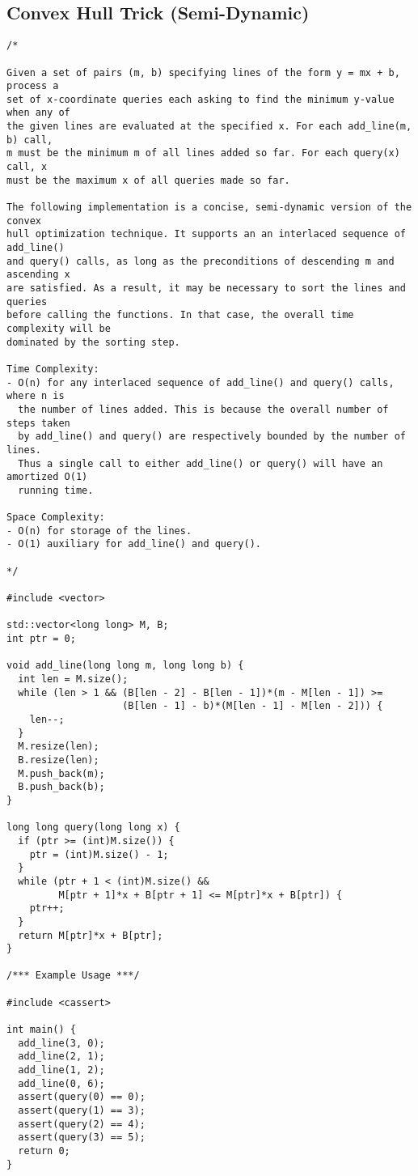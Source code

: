 \subsection{Convex Hull Trick (Semi-Dynamic)}
\begin{lstlisting}
/*

Given a set of pairs (m, b) specifying lines of the form y = mx + b, process a
set of x-coordinate queries each asking to find the minimum y-value when any of
the given lines are evaluated at the specified x. For each add_line(m, b) call,
m must be the minimum m of all lines added so far. For each query(x) call, x
must be the maximum x of all queries made so far.

The following implementation is a concise, semi-dynamic version of the convex
hull optimization technique. It supports an an interlaced sequence of add_line()
and query() calls, as long as the preconditions of descending m and ascending x
are satisfied. As a result, it may be necessary to sort the lines and queries
before calling the functions. In that case, the overall time complexity will be
dominated by the sorting step.

Time Complexity:
- O(n) for any interlaced sequence of add_line() and query() calls, where n is
  the number of lines added. This is because the overall number of steps taken
  by add_line() and query() are respectively bounded by the number of lines.
  Thus a single call to either add_line() or query() will have an amortized O(1)
  running time.

Space Complexity:
- O(n) for storage of the lines.
- O(1) auxiliary for add_line() and query().

*/

#include <vector>

std::vector<long long> M, B;
int ptr = 0;

void add_line(long long m, long long b) {
  int len = M.size();
  while (len > 1 && (B[len - 2] - B[len - 1])*(m - M[len - 1]) >=
                    (B[len - 1] - b)*(M[len - 1] - M[len - 2])) {
    len--;
  }
  M.resize(len);
  B.resize(len);
  M.push_back(m);
  B.push_back(b);
}

long long query(long long x) {
  if (ptr >= (int)M.size()) {
    ptr = (int)M.size() - 1;
  }
  while (ptr + 1 < (int)M.size() &&
         M[ptr + 1]*x + B[ptr + 1] <= M[ptr]*x + B[ptr]) {
    ptr++;
  }
  return M[ptr]*x + B[ptr];
}

/*** Example Usage ***/

#include <cassert>

int main() {
  add_line(3, 0);
  add_line(2, 1);
  add_line(1, 2);
  add_line(0, 6);
  assert(query(0) == 0);
  assert(query(1) == 3);
  assert(query(2) == 4);
  assert(query(3) == 5);
  return 0;
}
\end{lstlisting}
